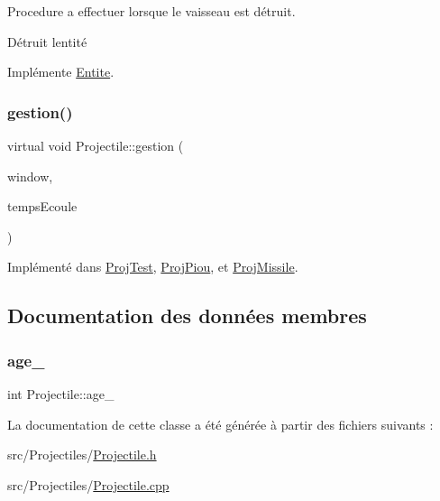 Procedure a effectuer lorsque le vaisseau est détruit. 

Détruit l\textquotesingle{}entité 

Implémente \hyperlink{class_entite_af5c424f69b2c880ae9c12786abd28592}{Entite}.

\mbox{\label{class_projectile_a09e02b793473660fc59a329a4dfea0ec}} 
\subsubsection{\texorpdfstring{gestion()}{gestion()}}
{\footnotesize\ttfamily virtual void Projectile\+::gestion (\begin{DoxyParamCaption}\item[{sf\+::\+Render\+Window \&}]{window,  }\item[{sf\+::\+Time}]{temps\+Ecoule }\end{DoxyParamCaption})\hspace{0.3cm}{\ttfamily [pure virtual]}}



Implémenté dans \hyperlink{class_proj_test_aec696ef399dbe4a7d6cbca6d68196909}{Proj\+Test}, \hyperlink{class_proj_piou_a6efae1f583527446ef824fc1d2823a02}{Proj\+Piou}, et \hyperlink{class_proj_missile_a6e7a2c8180b7275a1d03340229d83bf3}{Proj\+Missile}.



\subsection{Documentation des données membres}
\mbox{\label{class_projectile_a1f0a231e002d4796c32ccfeb36c887b1}} 
\subsubsection{\texorpdfstring{age\+\_\+}{age\_}}
{\footnotesize\ttfamily int Projectile\+::age\+\_\+\hspace{0.3cm}{\ttfamily [protected]}}



La documentation de cette classe a été générée à partir des fichiers suivants \+:\begin{DoxyCompactItemize}
\item 
src/\+Projectiles/\hyperlink{_projectile_8h}{Projectile.\+h}\item 
src/\+Projectiles/\hyperlink{_projectile_8cpp}{Projectile.\+cpp}\end{DoxyCompactItemize}
